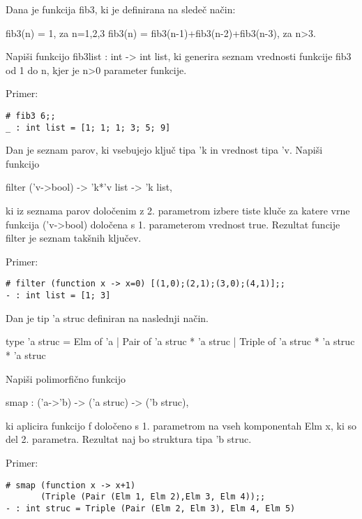 \begin{ex}
  Dana je funkcija fib3, ki je definirana na slede\v c na\v cin:

  fib3(n) = 1, za n=1,2,3
  fib3(n) = fib3(n-1)+fib3(n-2)+fib3(n-3), za n>3.

  Napi\v si funkcijo fib3list : int -> int list, ki generira seznam
  vrednosti funkcije fib3 od 1 do n, kjer je n>0 parameter funkcije.

\noindent\/Primer:
\begin{verbatim}
# fib3 6;;
_ : int list = [1; 1; 1; 3; 5; 9]
\end{verbatim}

%
%
%

\end{ex} 
\begin{ex}
  Dan je seznam parov, ki vsebujejo klju\v c tipa 'k in vrednost tipa
  'v. Napi\v si funkcijo

  filter ('v->bool) -> 'k*'v list -> 'k list,

  ki iz seznama parov dolo\v cenim z 2. parametrom izbere tiste klu\v
  ce za katere vrne funkcija ('v->bool) dolo\v cena s 1. parameterom
  vrednost true. Rezultat funcije filter je seznam tak\v snih klju\v
  cev.

\noindent\/Primer:
\begin{verbatim}
# filter (function x -> x=0) [(1,0);(2,1);(3,0);(4,1)];; 
- : int list = [1; 3] 

\end{verbatim}

\end{ex} 
\begin{ex}
  Dan je tip 'a struc definiran na naslednji na\v cin.

  type 'a struc = 
      Elm of 'a 
    | Pair of 'a struc * 'a struc 
    | Triple of 'a struc * 'a struc * 'a struc

  Napi\v si polimorfi\v cno funkcijo

  smap : ('a->'b) -> ('a struc) -> ('b struc),

  ki aplicira funkcijo f dolo\v ceno s 1. parametrom na vseh
  komponentah Elm x, ki so del 2. parametra. Rezultat naj bo struktura
  tipa 'b struc.

\noindent\/Primer:            
\begin{verbatim}
# smap (function x -> x+1) 
       (Triple (Pair (Elm 1, Elm 2),Elm 3, Elm 4));; 
- : int struc = Triple (Pair (Elm 2, Elm 3), Elm 4, Elm 5) 
\end{verbatim}

\end{ex} 
